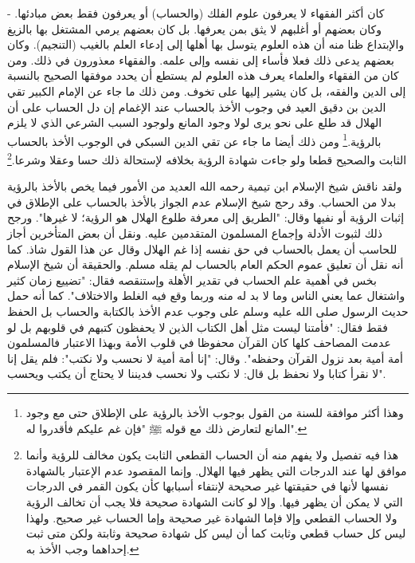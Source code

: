 - كان أكثر الفقهاء لا يعرفون علوم الفلك (والحساب) أو يعرفون فقط بعض مبادئها. وكان بعضهم أو أغلبهم لا يثق بمن يعرفها. بل كان بعضهم يرمي المشتغل بها بالزيغ والإبتداع ظنا منه أن هذه العلوم يتوسل بها أهلها إلى إدعاء العلم بالغيب (التنجيم). وكان بعضهم يدعى ذلك فعلا فأساء إلى نفسه وإلى علمه. والفقهاء معذورون في ذلك. ومن كان من الفقهاء والعلماء يعرف هذه العلوم لم يستطع أن يحدد موفقها الصحيح بالنسبة إلى الدين والفقه، بل كان يشير إليها على تخوف. ومن ذلك ما جاء عن الإمام الكبير تقي الدين بن دقيق العيد في وجوب الأخذ بالحساب عند الإغمام إن دل الحساب على أن الهلال قد طلع على نحو يرى لولا وجود المانع ولوجود السبب الشرعي الذي لا يلزم بالرؤية.\footnote{وهذا أكثر موافقة للسنة من القول بوجوب الأخذ بالرؤية على الإطلاق حتى مع وجود المانع لتعارض ذلك مع قوله ﷺ "فإن غم عليكم فأقدروا له".} ومن ذلك أيضا ما جاء عن تقي الدين السبكي في الوجوب الأخذ بالحساب الثابت والصحيح قطعا ولو جاءت شهادة الرؤية بخلافه لإستحالة ذلك حسا وعقلا وشرعا.\footnote{هذا فيه تفصيل ولا يفهم منه أن الحساب القطعي الثابت يكون مخالف للرؤية وأنما موافق لها عند الدرجات التي يظهر فيها الهلال. وإنما المقصود عدم الإعتبار بالشهادة نفسها لأنها في حقيقتها غير صحيحة لإنتفاء أسبابها كأن يكون القمر في الدرجات التي لا يمكن أن يظهر فيها. وإلا لو كانت الشهادة صحيحة فلا يجب أن تخالف الرؤية ولا الحساب القطعي وإلا فإما الشهادة غير صحيحة وإما الحساب غير صحيح. ولهذا ليس كل حساب قطعي وثابت كما أن ليس كل شهادة صحيحة وثابتة ولكن متى ثبت إحداهما وجب الأخذ به.}






























ولقد ناقش شيخ الإسلام ابن تيمية رحمه الله العديد من الأمور فيما يخص بالأخذ بالرؤية بدلا من الحساب. وقد رحج شيخ الإسلام عدم الجواز بالأخذ بالحساب على الإطلاق في إثبات الرؤية أو نفيها وقال: "الطريق إلى معرفة طلوع الهلال هو الرؤية؛ لا غيرها". ورجح ذلك لثبوت الأدلة وإجماع المسلمون المتقدمين عليه. ونقل أن بعض المتأخرين أجاز للحاسب أن يعمل بالحساب في حق نفسه إذا غم الهلال وقال عن هذا القول شاذ. كما أنه نقل أن تعليق عموم الحكم العام بالحساب لم يقله مسلم. والحقيقة أن شيخ الإسلام بخس في أهمية علم الحساب في تقدير الأهلة وإستنقصه فقال: "تضييع زمان كثير واشتغال عما يعني الناس وما لا بد له منه وربما وقع فيه الغلط والاختلاف". كما أنه حمل حديث الرسول صلى الله عليه وسلم على وجوب عدم الأخذ بالكتابة والحساب بل الحفظ فقط فقال: "فأمتنا ليست مثل أهل الكتاب الذين لا يحفظون كتبهم في قلوبهم بل لو عدمت المصاحف كلها كان القرآن محفوظا في قلوب الأمة وبهذا الاعتبار فالمسلمون أمة أمية بعد نزول القرآن وحفظه". وقال: "إنا أمة أمية لا نحسب ولا نكتب": فلم يقل إنا لا نقرأ كتابا ولا نحفظ بل قال: لا نكتب ولا نحسب فديننا لا يحتاج أن يكتب ويحسب".

